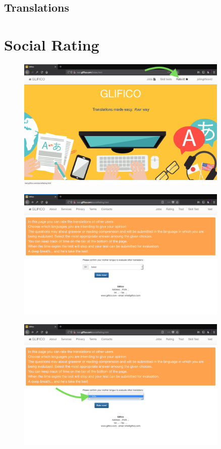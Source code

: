 \documentclass[11 pt, a4paper]{article}
\begin{document}
\clearpage
\subsection{Translations}

\clearpage
\section{Social Rating}
\begin{figure}[H]
\centering
\includegraphics[width=0.9\textwidth]{translator_socialrating0.png}
\end{figure}


\begin{figure}[H]
\centering
\includegraphics[width=0.9\textwidth]{translator_socialrating1.png}
\end{figure}


\clearpage
\begin{figure}[H]
\centering
\includegraphics[width=0.9\textwidth]{translator_socialrating2.png}
\end{figure}
\end{document}

